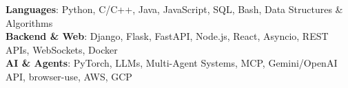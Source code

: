 \begin{itemize}[leftmargin=0.15in, label={}]
    \small{\item{
     \textbf{Languages}{: Python, C/C++, Java, JavaScript, SQL, Bash, Data Structures \& Algorithms} \\
     \textbf{Backend \& Web}{: Django, Flask, FastAPI, Node.js, React, Asyncio, REST APIs, WebSockets, Docker} \\
     \textbf{AI \& Agents}{: PyTorch, LLMs, Multi-Agent Systems, MCP, Gemini/OpenAI API, browser-use, AWS, GCP}
    }}
\end{itemize}
